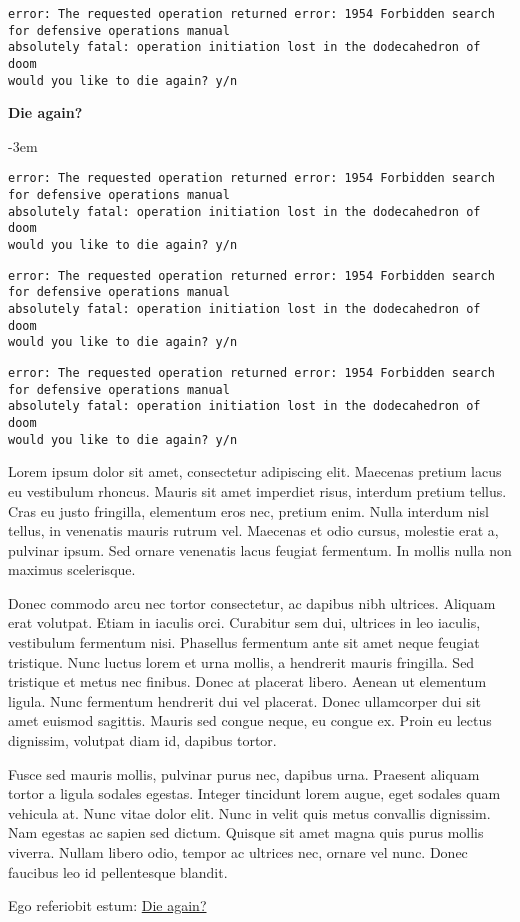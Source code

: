 
\begin{verbatim}
error: The requested operation returned error: 1954 Forbidden search for defensive operations manual
absolutely fatal: operation initiation lost in the dodecahedron of doom
would you like to die again? y/n
\end{verbatim}


\hypertarget{error}{{\bf Die again?}}\vglue-3em
\begin{verbatim}
error: The requested operation returned error: 1954 Forbidden search for defensive operations manual
absolutely fatal: operation initiation lost in the dodecahedron of doom
would you like to die again? y/n
\end{verbatim}



\begin{verbatim}
error: The requested operation returned error: 1954 Forbidden search for defensive operations manual
absolutely fatal: operation initiation lost in the dodecahedron of doom
would you like to die again? y/n
\end{verbatim}



\begin{verbatim}
error: The requested operation returned error: 1954 Forbidden search for defensive operations manual
absolutely fatal: operation initiation lost in the dodecahedron of doom
would you like to die again? y/n
\end{verbatim}


Lorem ipsum dolor sit amet, consectetur adipiscing elit. Maecenas pretium lacus eu vestibulum rhoncus. Mauris sit amet imperdiet risus, interdum pretium tellus. Cras eu justo fringilla, elementum eros nec, pretium enim. Nulla interdum nisl tellus, in venenatis mauris rutrum vel. Maecenas et odio cursus, molestie erat a, pulvinar ipsum. Sed ornare venenatis lacus feugiat fermentum. In mollis nulla non maximus scelerisque.


Donec commodo arcu nec tortor consectetur, ac dapibus nibh ultrices. Aliquam erat volutpat. Etiam in iaculis orci. Curabitur sem dui, ultrices in leo iaculis, vestibulum fermentum nisi. Phasellus fermentum ante sit amet neque feugiat tristique. Nunc luctus lorem et urna mollis, a hendrerit mauris fringilla. Sed tristique et metus nec finibus. Donec at placerat libero. Aenean ut elementum ligula. Nunc fermentum hendrerit dui vel placerat. Donec ullamcorper dui sit amet euismod sagittis. Mauris sed congue neque, eu congue ex. Proin eu lectus dignissim, volutpat diam id, dapibus tortor.


Fusce sed mauris mollis, pulvinar purus nec, dapibus urna. Praesent aliquam tortor a ligula sodales egestas. Integer tincidunt lorem augue, eget sodales quam vehicula at. Nunc vitae dolor elit. Nunc in velit quis metus convallis dignissim. Nam egestas ac sapien sed dictum. Quisque sit amet magna quis purus mollis viverra. Nullam libero odio, tempor ac ultrices nec, ornare vel nunc. Donec faucibus leo id pellentesque blandit.


Ego referiobit estum: \hyperlink{error}{Die again?}
